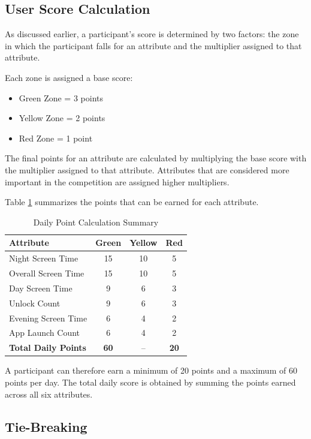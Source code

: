 \documentclass[11pt]{report}
\begin{document}
\subsection{User Score Calculation}

As discussed earlier, a participant's score is determined by two factors: the zone in which the participant falls for an attribute and the multiplier assigned to that attribute.

Each zone is assigned a base score:

\begin{itemize}
\item Green Zone = 3 points
\item Yellow Zone = 2 points
\item Red Zone = 1 point
\end{itemize}

The final points for an attribute are calculated by multiplying the base score with the multiplier assigned to that attribute. Attributes that are considered more important in the competition are assigned higher multipliers.

Table \ref{tab:daily_point_calculation} summarizes the points that can be earned for each attribute.

\begin{table}[H]
\centering
\caption{Daily Point Calculation Summary}
\label{tab:daily_point_calculation}
\begin{tabular}{|l|c|c|c|}
\hline
\textbf{Attribute} & \textbf{Green} & \textbf{Yellow} & \textbf{Red} \\
\hline
Night Screen Time & 15 & 10 & 5 \\
\hline
Overall Screen Time & 15 & 10 & 5 \\
\hline
Day Screen Time & 9 & 6 & 3 \\
\hline
Unlock Count & 9 & 6 & 3 \\
\hline
Evening Screen Time & 6 & 4 & 2 \\
\hline
App Launch Count & 6 & 4 & 2 \\
\hline
\textbf{Total Daily Points} & \textbf{60} & -- & \textbf{20} \\
\hline
\end{tabular}
\end{table}

A participant can therefore earn a minimum of 20 points and a maximum of 60 points per day. The total daily score is obtained by summing the points earned across all six attributes.

\subsection{Tie-Breaking}
\end{document}
